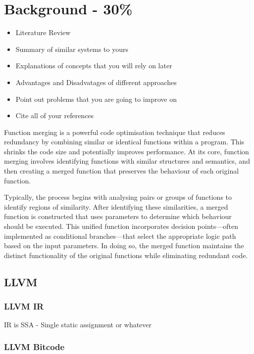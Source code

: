 \chapter{Background - 30\%}


\begin{itemize}
    \item Literature Review
    \item Summary of similar systems to yours
    \item Explanations of concepts that you will rely on later
    \item Advantages and Disadvatages of different approaches
    \item Point out problems that you are going to improve on
    \item Cite all of your references
\end{itemize}

Function merging is a powerful code optimisation technique that reduces redundancy by combining similar or identical functions within a program. This shrinks the code size and potentially improves performance. At its core, function merging involves identifying functions with similar structures and semantics, and then creating a merged function that preserves the behaviour of each original function.

Typically, the process begins with analysing pairs or groups of functions to identify regions of similarity. After identifying these similarities, a merged function is constructed that uses parameters to determine which behaviour should be executed. This unified function incorporates decision points—often implemented as conditional branches—that select the appropriate logic path based on the input parameters. In doing so, the merged function maintains the distinct functionality of the original functions while eliminating redundant code.

\section{LLVM}
\subsection{LLVM IR} \label{LLVM:IR}
IR is SSA - Single static assignment or whatever
\subsection{LLVM Bitcode} \label{LLVM:Bitcode}



